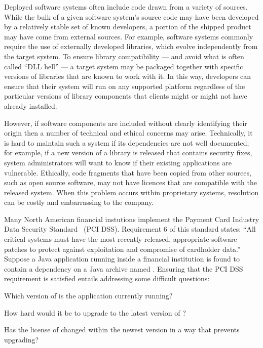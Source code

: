 \label{chapter:introduction}


Deployed software systems often include code drawn from a
variety of sources.  While the bulk of a given software system's
source code may have been developed by a relatively stable set of known
developers, a portion of the shipped product may have come from
external sources.  For example, software systems commonly require the use
of externally developed libraries, which evolve independently from the
target system.  To ensure library compatibility --- and avoid what is often
called ``DLL hell'' --- a target system may be packaged together with
specific versions of libraries that are known to work with it.  In this
way, developers can ensure that their system will run on any supported
platform regardless of the particular versions of library components that
clients might or might not have already installed.

However, if software components are included without clearly identifying
their origin then a number of technical and ethical concerns may arise.
Technically, it is hard to maintain such a system if its dependencies are
not well documented; for example, if a new version of a library is released
that contains security fixes, system administrators will want to know if
their existing applications are vulnerable.  Ethically, code fragments that
have been copied from other sources, such as open source software, may not
have licences that are compatible with the released system.  When this problem
occurs within proprietary systems, resolution can be costly and
embarrassing to the company.

Many North American financial instutions implement the Payment Card
Industry Data Security Standard~\cite{PCI_DSS_121} (PCI DSS).  Requirement
6 of this standard states: ``All critical systems must have the most
recently released, appropriate software patches to protect against
exploitation and compromise of cardholder data.''  Suppose a Java
application running inside a financial institution is found to contain a
dependency on a Java archive named .  Ensuring that
the PCI DSS requirement is satisfied entails addressing some difficult
questions:

\begin{compactitem}
\item  Which version of  is the application
    currently running?

\item How hard would it be to upgrade to the latest version of
    ?

\item Has the license of  changed within the newest
    version in a way that prevents upgrading?

\end{compactitem}

